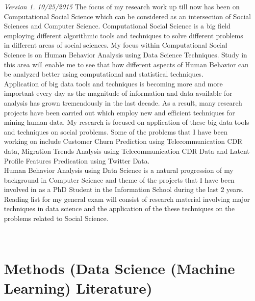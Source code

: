 \textit{Version 1. 10/25/2015}   
The focus of my research work up till now has been on Computational Social Science which can be considered as an intersection of Social Sciences and Computer Science. Computational Social Science is a big field employing different algorithmic tools and techniques to solve different problems in different areas of social sciences. My focus within Computational Social Science is on Human Behavior Analysis using Data Science Techniques. Study in this area will enable me to see that how different aspects of Human Behavior can be analyzed better using computational and statistical techniques.\\ 
Application of big data tools and techniques is becoming more and more important every day as the magnitude of information and data available for analysis has grown tremendously in the last decade. As a result, many research projects have been carried out which employ new and efficient techniques for mining human data. My research is focused on application of these big data tools and techniques on social problems. Some of the problems that I have been working on include Customer Churn Prediction using Telecommunication CDR data, Migration Trends Analysis using Telecommunication CDR Data and Latent Profile Features Predication using Twitter Data.\\ 

Human Behavior Analysis using Data Science is a natural progression of my background in Computer Science and theme of the projects that I have been involved in as a PhD Student in the Information School during the last 2 years.   Reading list for my general exam will consist of research material involving major techniques in data science and the application of the these techniques on the problems related to Social Science.   

\\  \section{Methods (Data Science (Machine Learning) Literature)}

